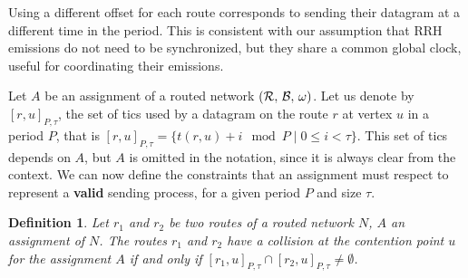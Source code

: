 \documentclass[a4paper,10pt]{journal}
\newtheorem{definition}{Definition}
\begin{document}
 	Using a different offset for each route corresponds to sending their datagram at a different time in the period. 
This is consistent with our assumption that RRH emissions do not need to be synchronized, but they share a common global clock, useful for coordinating their emissions.

 	Let $A$ be an assignment of a routed network $(\cal{R},\,\cal{B},\,\omega)$.
    Let us denote by $[r,u]_{P,\tau}$, the set of tics used by a datagram on the route $r$ at vertex $u$ in a period $P$, that is $[r,u]_{P,\tau} = \{t(r,u) + i \mod P \mid 0 \leq i < \tau \}$. This set of tics depends on $A$, but $A$ is omitted in the notation, since it is always clear from the context. We can now define the constraints that an assignment must respect to represent a \textbf{valid}
    sending process, for a given period $P$ and size $\tau$.



    \begin{definition}
    Let $r_1$ and $r_2$ be two routes of a routed network $N$, $A$ an assignment of $N$. The routes $r_1$ and $r_2$ have a collision at the contention point $u$ for the assignment $A$ if and only if $[r_1,u]_{P,\tau} \cap [r_2,u]_{P,\tau} \neq \emptyset$.
    \end{definition}
    
\end{document}

